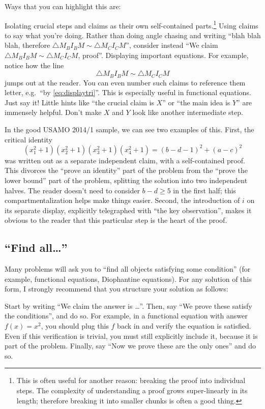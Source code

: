 \documentclass[11pt]{scrartcl}
\begin{document}
Ways that you can highlight this are:
\begin{itemize}
  \ii \alert{Isolating crucial steps and claims}
  as their own self-contained parts.\footnote{This is often useful for another reason:
    breaking the proof into individual steps.
    The complexity of understanding a proof grows super-linearly
    in its length; therefore breaking it into smaller chunks
    is often a good thing.}
  \ii Using \alert{claims} to say what you're doing.
  Rather than doing angle chasing and writing
  ``blah blah blah, therefore $\triangle M_B I_B M \sim \triangle M_C I_C M$'',
  consider instead ``We claim $\triangle M_B I_B M \sim \triangle M_C I_C M$, proof''.
  \ii \alert{Displaying important equations}.
  For example, notice how the line
  \begin{equation}
    \triangle M_B I_B M \sim \triangle M_C I_C M
    \label{eq:displaytri}
  \end{equation}
  jumps out at the reader.
  You can even number such claims to reference them letter,
  e.g.\ ``by \eqref{eq:displaytri}''.
  This is especially useful in functional equations.
  \ii \alert{Just say it}!
  Little hints like ``the crucial claim is $X$''
  or ``the main idea is $Y$'' are immensely helpful.
  Don't make $X$ and $Y$ look like another intermediate step.
\end{itemize}

In the good USAMO 2014/1 sample, we can see two examples of this.
First, the critical identity
\[ (x_1^2+1)(x_2^2+1)(x_3^2+1)(x_4^2+1) = (b-d-1)^2 + (a-c)^2 \]
was written out as a separate independent claim, with a self-contained proof.
This divorces the ``prove an identity'' part of the problem from the
``prove the lower bound'' part of the problem,
splitting the solution into two independent halves.
The reader doesn't need to consider $b-d \geq 5$ in the first half;
this compartmentalization helps make things easier.
Second, the introduction of $i$ on its separate display,
explicitly telegraphed with ``the key observation'',
makes it obvious to the reader that this particular step is the heart of the proof.

\subsection{``Find all\dots''}
Many problems will ask you to ``find all objects satisfying some condition''
(for example, functional equations, Diophantine equations).
For any solution of this form, I strongly recommend that you
structure your solution as follows:
\begin{itemize}
  \ii Start by writing ``\alert{We claim the answer is \dots}''.
  \ii Then, say ``\alert{We prove these satisfy the conditions}'', and do so.
  For example, in a functional equation with answer $f(x) = x^2$,
  you should plug this $f$ back in and verify the equation is satisfied.
  Even if this verification is trivial, you must still explicitly include it,
  because it is part of the problem.
  \ii Finally, say ``\alert{Now we prove these are the only ones}'' and do so.
\end{itemize}
\end{document}
